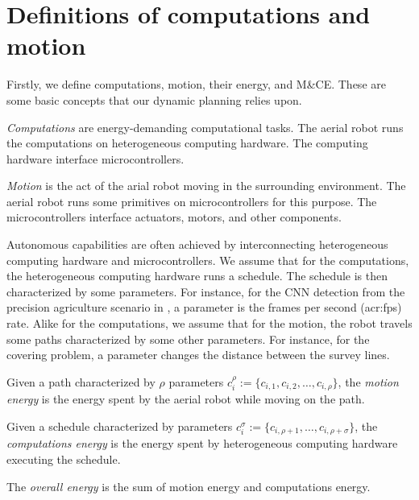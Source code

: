 \section{Definitions of computations and motion}
\label{sec:definitions}

Firstly, we define computations, motion, their energy, and M\&CE. These are some basic concepts that our dynamic planning relies upon.

\begin{highlight}
  \begin{defn}\label{def:comps}
    \emph{Computations} are energy-demanding computational tasks. The aerial robot runs the computations on heterogeneous computing hardware. The computing hardware interface microcontrollers.
    
    \emph{Motion} is the act of the arial robot moving in the surrounding environment. The aerial robot runs some primitives on microcontrollers for this purpose. The microcontrollers interface actuators, motors, and other components.
  \end{defn}
\end{highlight}

Autonomous capabilities are often achieved by interconnecting heterogeneous computing hardware and microcontrollers. We assume that for the computations, the heterogeneous computing hardware runs a schedule. The schedule is then characterized by some parameters. For instance, for the CNN detection from the precision agriculture scenario in , a parameter is the frames per second (\Gls{acr:fps}) rate. Alike for the computations, we assume that for the motion, the robot travels some paths characterized by some other parameters. For instance, for the covering problem, a parameter changes the distance between the survey lines.

\begin{highlight}
\begin{defn}\label{def:comp-mot-energy}
  Given a path characterized by $\rho$ parameters $c_i^\rho:=\{c_{i,1},c_{i,2},\dots,c_{i,\rho}\}$, the \emph{motion energy} is the energy spent by the aerial robot while moving on the path.

  Given a schedule characterized by parameters $c_i^\sigma:=\{c_{i,\rho+1},\dots,c_{i,\rho+\sigma}\}$, the \emph{computations energy} is the energy spent by heterogeneous computing hardware executing the schedule.

  The \emph{overall energy} is the sum of motion energy and computations energy.
\end{defn}
\end{highlight}

